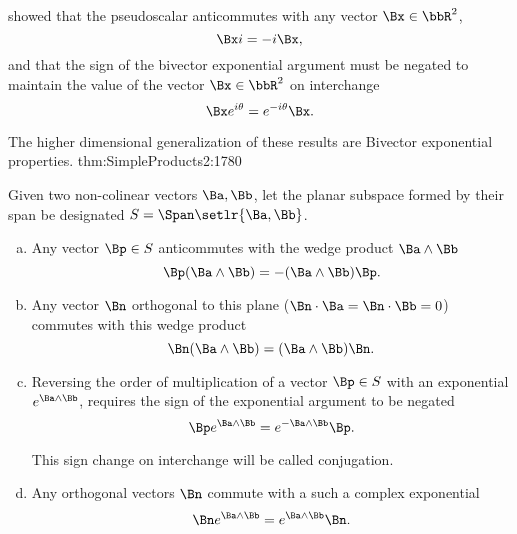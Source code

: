%
%
 showed that the  pseudoscalar anticommutes with any vector \( \Bx \in \bbR^{2} \),
\begin{equation}\label{eqn:generalRotation:1760}
\Bx i = -i \Bx,
\end{equation}
and that the sign of the bivector exponential argument must be negated to maintain the value of the vector \( \Bx \in \bbR^2 \) on interchange
\begin{equation}\label{eqn:generalRotation:1820}
\Bx e^{i\theta} = e^{-i\theta} \Bx.
\end{equation}

The higher dimensional generalization of these results are
\maketheorem
{Bivector exponential properties.}
{thm:SimpleProducts2:1780}{
Given two
non-colinear vectors \( \Ba, \Bb \), let
the planar subspace formed by their span be designated
\( S = \Span \setlr{ \Ba, \Bb } \).

\begin{enumerate}[(a)]
\item
Any vector \( \Bp \in S \) anticommutes with the wedge product \( \Ba \wedge \Bb \)
\begin{equation*}
\Bp (\Ba \wedge \Bb) = - (\Ba \wedge \Bb) \Bp.
\end{equation*}
\item
Any vector \( \Bn \) orthogonal to this plane (\( \Bn \cdot \Ba = \Bn \cdot \Bb = 0 \)) commutes with this wedge product
\begin{equation*}
\Bn (\Ba \wedge \Bb) = (\Ba \wedge \Bb) \Bn.
\end{equation*}
\item
Reversing the order of multiplication of a
vector \( \Bp \in S \) with an exponential
\( e^{ \Ba \wedge \Bb } \), requires the sign of the exponential argument to be negated
\begin{equation*}
\Bp e^{\Ba \wedge \Bb} = e^{-\Ba \wedge \Bb} \Bp.
\end{equation*}

This sign change on interchange will be called conjugation.
\item
Any orthogonal vectors \( \Bn \) commute with a such a complex exponential
\begin{equation*}
\Bn e^{\Ba \wedge \Bb} = e^{\Ba \wedge \Bb} \Bn.
\end{equation*}
\end{enumerate}
} %
